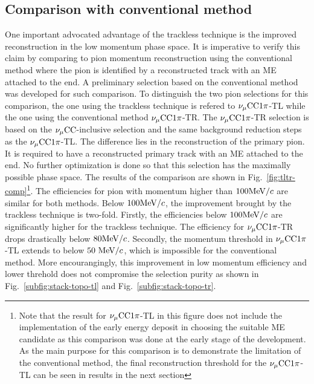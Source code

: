      \subsection{Comparison with conventional method}
          One important advocated advantage of the trackless technique is the improved reconstruction in the low momentum phase space.
          It is imperative to verify this claim by comparing to pion momentum reconstruction using the conventional method where the pion is identified by a reconstructed track with an ME attached to the end.
          A preliminary selection based on the conventional method was developed for such comparison.
          To distinguish the two pion selections for this comparison, the one using the trackless technique is refered to $\nu_{\mu}\textrm{CC}1\pi$-TL while the one using the conventional method $\nu_{\mu}\textrm{CC}1\pi$-TR.
          The $\nu_{\mu}\textrm{CC}1\pi$-TR selection is based on the $\nu_{\mu}\textrm{CC}$-inclusive selection and the same background reduction steps as the $\nu_{\mu}\textrm{CC}1\pi$-TL.
          The difference lies in the reconstruction of the primary pion.
          It is required to have a reconstructed primary track with an ME attached to the end.
          No further optimization is done so that this selection has the maximally possible phase space.
          The results of the comparison are shown in Fig.~\ref{fig:tltr-comp}\footnote{Note that the result for $\nu_{\mu}\textrm{CC}1\pi$-TL in this figure does not include the implementation of the early energy deposit in choosing the suitable ME candidate as this comparison was done at the early stage of the development.
          As the main purpose for this comparison is to demonstrate the limitation of the conventional method, the final reconstruction threshold for the $\nu_{\mu}\textrm{CC}1\pi$-TL can be seen in results in the next section}.
          The efficiencies for pion with momentum higher than $100\textrm{MeV}/c$ are similar for both methods.
          Below $100\textrm{MeV}/c$, the improvement brought by the trackless technique is two-fold.
          Firstly, the efficiencies below $100\textrm{MeV}/c$ are significantly higher for the trackless technique.
          The efficiency for $\nu_{\mu}\textrm{CC}1\pi$-TR drops drastically below $80\textrm{MeV}/c$.
          Secondly, the momentum threshold in $\nu_{\mu}\textrm{CC}1\pi$-TL extends to below $50~\textrm{MeV}/c$, which is impossible for the conventional method.
          More encourangingly, this improvement in low momentum efficiency and lower threhold does not compromise the selection purity as shown in Fig.~\ref{subfig:stack-topo-tl} and Fig.~\ref{subfig:stack-topo-tr}.
